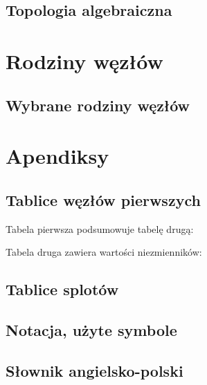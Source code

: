 \documentclass{LegrandOrangeBook}
\begin{document}
\chapter{Topologia algebraiczna}






\part{Rodziny węzłów}
\chapter{Wybrane rodziny węzłów}










\part{Apendiksy}
\chapterspaceabove{5.75cm} %
\chapterspacebelow{7.25cm} %

\begin{appendices}
    \renewcommand{\chaptername}{Appendix} %
    \chapter{Tablice węzłów pierwszych}
    
    Tabela pierwsza podsumowuje tabelę drugą:
    
    \newpage
    Tabela druga zawiera wartości niezmienników:
    
    

    \chapter{Tablice splotów}
    

    \chapter{Notacja, użyte symbole}
    

    \chapter{Słownik angielsko-polski}
    \begin{compactitem}
    
    \end{compactitem}
\end{appendices}


\end{document}
